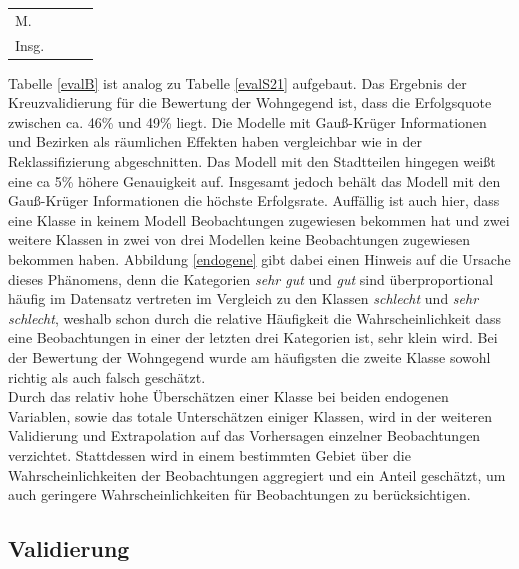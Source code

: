 \documentclass{Vorlage}
\begin{document}
\begin{table}[h]
\begin{tabular}{lc|ccccccccccccccc}
\multicolumn{2}{l|}{M.}                                                  & \multicolumn{5}{c|}{}                          & \multicolumn{5}{c|}{}                          & \multicolumn{5}{c}{}                        \\
\multicolumn{2}{l|}{Insg.}                                               & \multicolumn{5}{c|}{}                          & \multicolumn{5}{c|}{}                          & \multicolumn{5}{c}{}                        \\ \hline  \hline
\end{tabular}
\end{table}

Tabelle \ref{evalB} ist analog zu Tabelle \ref{evalS21} aufgebaut. Das Ergebnis der Kreuzvalidierung für die Bewertung der Wohngegend ist, dass die Erfolgsquote zwischen ca. 46\% und 49\% liegt. Die Modelle mit Gauß-Krüger Informationen und Bezirken als räumlichen Effekten haben vergleichbar wie in der Reklassifizierung abgeschnitten. Das Modell mit den Stadtteilen hingegen weißt eine ca 5\% höhere Genauigkeit auf. Insgesamt jedoch behält das Modell mit den Gauß-Krüger Informationen die höchste Erfolgsrate. Auffällig ist auch hier, dass eine Klasse in keinem Modell Beobachtungen zugewiesen bekommen hat und zwei weitere Klassen in zwei von drei Modellen keine Beobachtungen zugewiesen bekommen haben. Abbildung \ref{endogene} gibt dabei einen Hinweis auf die Ursache dieses Phänomens, denn die Kategorien \textit{sehr gut} und \textit{gut} sind überproportional häufig im Datensatz vertreten im Vergleich zu den Klassen \textit{schlecht} und \textit{sehr schlecht}, weshalb schon durch die relative Häufigkeit die Wahrscheinlichkeit dass eine Beobachtungen in einer der letzten drei Kategorien ist, sehr klein wird. Bei der Bewertung der Wohngegend wurde am häufigsten die zweite Klasse sowohl richtig als auch falsch geschätzt.\\
Durch das relativ hohe Überschätzen einer Klasse bei beiden endogenen Variablen, sowie das totale Unterschätzen einiger Klassen, wird in der weiteren Validierung und Extrapolation auf das Vorhersagen einzelner Beobachtungen verzichtet. Stattdessen wird in einem bestimmten Gebiet über die Wahrscheinlichkeiten der Beobachtungen aggregiert und ein Anteil geschätzt, um auch geringere Wahrscheinlichkeiten für Beobachtungen zu berücksichtigen.

\subsection{Validierung}
\end{document}
